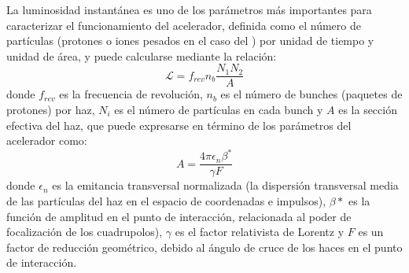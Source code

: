 La luminosidad instantánea es uno de los parámetros más importantes para caracterizar el funcio­namiento del acelerador, definida como el número de partículas (protones o iones pesados en el caso del \LHC) por unidad de tiempo y unidad de área, y puede calcularse mediante la relación:
\begin{equation}
\mathcal{L} = f_{rev} n_b \dfrac{N_1 N_2}{A}
\end{equation}
donde $f_{rev}$ es la frecuencia de revolución, $n_b$ es el número de bunches (paquetes de protones) por haz, $N_i$ es el número de partículas en cada bunch y $A$ es la sección efectiva del haz, que puede expresarse en término de los parámetros del acelerador como:
\begin{equation}
A = \dfrac{4 \pi \epsilon_n \beta^*}{\gamma F}
\end{equation}
donde $\epsilon_n$ es la emitancia transversal normalizada (la dispersión transversal media de las partículas del
haz en el espacio de coordenadas e impulsos), $\beta*$ es la función de amplitud en el punto de interacción, relacionada al poder de focalización de los cuadrupolos), $\gamma$ es el factor relativista de Lorentz y $F$ es un factor de reducción geométrico, debido al ángulo de cruce de los haces en el punto de interacción.







